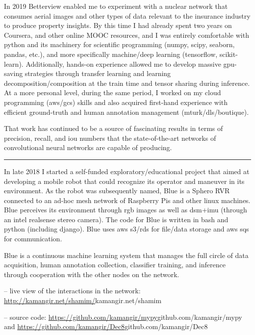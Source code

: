 \osspacing
In 2019 Betterview enabled me to experiment with a nuclear network that consumes aerial images and other types of data relevant to the insurance industry to produce property insights. By this time I had already spent two years on Coursera, and other online MOOC resources, and I was entirely comfortable with python and its machinery for scientific programming (numpy, scipy, seaborn, pandas, etc.), and more specifically machine/deep learning (tensorflow, scikit-learn). Additionally, hands-on experience allowed me to develop massive gpu-saving strategies through transfer learning and learning decomposition/composition at the train time and tensor sharing during inference. At a more personal level, during the same period, I worked on my cloud programming (aws/gcs) skills and also acquired first-hand experience with efficient ground-truth and human annotation management (mturk/dls/boutique). 

\osspacing
That work has continued to be a source of fascinating results in terms of precision, recall, and iou numbers that the state-of-the-art networks of convolutional neural networks are capable of producing.

\noindent\rule{8cm}{0.4pt}

\osspacing
In late 2018 I started a self-funded exploratory/educational project that aimed at developing a mobile robot that could recognize its operator and maneuver in its environment. As the robot was subsequently named, Blue is a Sphero RVR connected to an ad-hoc mesh network of Raspberry Pis and other linux machines. Blue perceives its environment through rgb images as well as dsm+imu (through an intel realsense stereo camera). The code for Blue is written in bash and python (including django). Blue uses aws s3/rds for file/data storage and aws sqs for communication. 

\osspacing
Blue is a continuous machine learning system that manages the full circle of data acquisition, human annotation collection, classifier training, and inference through cooperation with the other nodes on the network. 

-- live view of the interactions in the network: \url{http://kamangir.net/shamim/}{kamangir.net/shamim} 

-- source code: \url{https://github.com/kamangir/mypy}{github.com/kamangir/mypy} and \url{https://github.com/kamangir/Dec8}{github.com/kamangir/Dec8}

